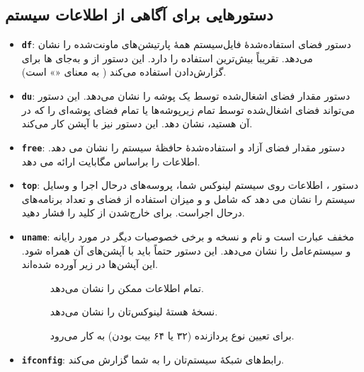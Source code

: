 \subsection{دستورهایی برای آگاهی از اطلاعات سیستم}
\begin{itemize}
\item \textbf{\texttt{\Large df}}: دستور  فضای استفاده‌شدهٔ فایل‌سیستم همهٔ پارتیشن‌های ماونت‌شده را نشان می‌دهد.  تقریباً بیش‌ترین استفاده را دارد. این دستور از  و  به‌جای ها برای گزارش‌دادن استفاده می‌کند ( به معنای «» است).

\item \textbf{\texttt{\Large du}}: دستور  مقدار فضای اشغال‌شده توسط یک پوشه را نشان می‌دهد. این دستور می‌تواند فضای اشغال‌شده توسط تمام زیرپوشه‌ها یا تمام فضای پوشه‌ای را که در آن هستید، نشان دهد. این دستور نیز با آپشن  کار می‌کند.

\item \textbf{\texttt{\Large free}}: دستور  مقدار فضای آزاد و استفاده‌شدهٔ حافظهٔ سیستم را نشان می دهد.  اطلاعات را براساس مگابایت ارائه می دهد.

\item \textbf{\texttt{\Large top}}: دستور ، اطلاعات روی سیستم لینوکس شما، پروسه‌های درحال اجرا و وسایل سیستم را نشان می دهد که شامل  و  و میزان استفاده از فضای  و تعداد برنامه‌های درحال اجراست. برای خارج‌شدن از  کلید  را فشار دهید.

\item \textbf{\texttt{\Large uname}}: مخفف عبارت  است و نام و نسخه و برخی خصوصیات دیگر در مورد رایانه و سیستم‌عامل را نشان می‌دهد. این دستور حتماً باید با آپشن‌های آن همراه شود. این آپشن‌ها در زیر آورده شده‌اند.
\begin{description}
\item[] تمام اطلاعات ممکن را نشان می‌دهد.

\item[] نسخهٔ هستهٔ لینوکس‌تان را نشان می‌دهد.

\item[] برای تعیین نوع پردازنده (۳۲ یا ۶۴ بیت بودن) به کار می‌رود.
\end{description}

\item \textbf{\texttt{\Large ifconfig}}: رابط‌های شبکهٔ سیستم‌تان را به شما گزارش می‌کند.


\end{itemize}
